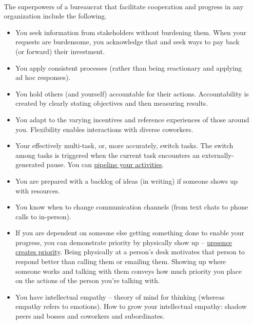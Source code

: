 \ \\

The superpowers of a bureaucrat that facilitate cooperation and progress in any organization include the following.
\begin{itemize}
\item You seek information from stakeholders without burdening them. When your requests are burdensome, you acknowledge that and seek ways to pay back (or forward) their investment.
\item You apply consistent processes (rather than being reactionary and applying ad hoc responses).
\item You hold others (and yourself) accountable for their actions. Accountability is created by clearly stating objectives and then measuring results.
\item You adapt to the varying incentives and reference experiences of those around you. Flexibility enables interactions with diverse coworkers. 
    \item Your effectively multi-task, or, more accurately, switch tasks. The switch among tasks is triggered when the current task encounters an externally-generated pause. You can \href{https://en.wikipedia.org/wiki/Pipeline_(computing)#Concept_and_motivation}{pipeline your activities}.
\iftoggle{WPinmargin}{\marginpar{[Wikipedia] pipeline\\(computing)}}{}
    \item You are prepared with a backlog of ideas (in writing) if someone shows up with resources.
    \item You know when to change communication channels (from text chats to phone calls to in-person). 
    \item If you are dependent on someone else getting something done to enable your progress, you can demonstrate priority by physically show up -- \underline{presence creates priority}. 
    Being physically at a person's desk motivates that person to respond better than calling them or emailing them. Showing up where someone works and talking with them conveys how much priority you place on the actions of the person you're talking with.
    \item You have intellectual empathy -- theory of mind for thinking (whereas empathy refers to emotions). How to grow your intellectual empathy: shadow peers and bosses and coworkers and subordinates.

\end{itemize}
